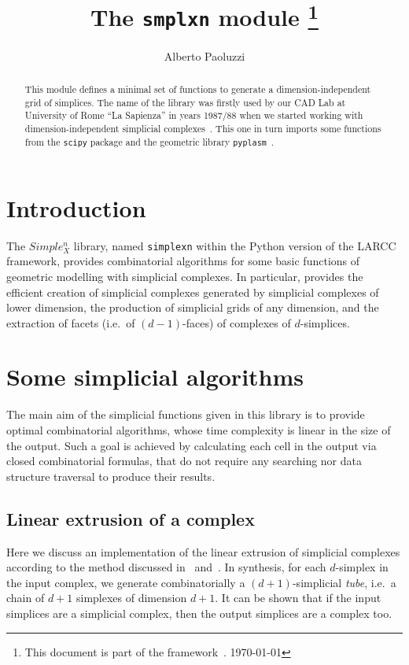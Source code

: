 \documentclass[11pt,oneside]{article}	%
\title{The \texttt{smplxn} module
\footnote{This document is part of the framework~\cite{cclar-proj:2013:00}. \today}
}
\author{Alberto Paoluzzi}
\begin{document}
\maketitle
\nonstopmode

\begin{abstract}
This module defines a minimal set of functions to generate a dimension-independent grid of simplices.
The name of the library was firstly used by our CAD Lab at University of Rome ``La Sapienza'' in years 1987/88 when we started working with dimension-independent simplicial complexes~\cite{Paoluzzi:1993:DMS:169728.169719}. This one in turn imports some functions from the \texttt{scipy} package and the geometric library \texttt{pyplasm}~\cite{}.
\end{abstract}

\tableofcontents\newpage

\section{Introduction}

The $Simple_X^n$ library, named \texttt{simplexn} within the Python version of the LARCC framework,
provides  combinatorial algorithms for some basic functions of geometric modelling with simplicial complexes. In particular, provides the efficient creation of simplicial complexes generated by simplicial complexes of lower dimension, the production of simplicial grids of any dimension, and the extraction of facets (i.e.~of $(d-1)$-faces) of complexes of $d$-simplices.

\section{Some simplicial algorithms}

The main aim of the simplicial functions given in this library is to provide optimal combinatorial algorithms, whose time complexity is linear in the size of the output.
Such a goal is achieved by calculating each cell in the output via closed combinatorial formulas, that do not require any searching nor data structure traversal to produce their results.

\subsection{Linear extrusion of a complex}

Here we discuss an implementation of the linear extrusion of simplicial complexes according to the method discussed in~\cite{Paoluzzi:1993:DMS:169728.169719} and~\cite{DBLP:journals/cad/FerruciP91}. In synthesis, for each $d$-simplex in the input complex, we generate combinatorially a $(d+1)$-simplicial \emph{tube}, i.e.~a chain of $d+1$ simplexes of dimension $d+1$. It can be shown that if the input simplices are a simplicial complex, then the output simplices are a complex too. 
\end{document}
